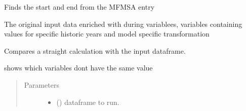 \documentclass[letterpaper,10pt,english]{sphinxmanual}
\begin{document}
\begin{fulllineitems}
\begin{fulllineitems}
\end{fulllineitems}


\begin{fulllineitems}
\label{\detokenize{onboard/modelgrabwf2:modelgrabwf2.GrabWfModel.mfmsa_start_end}}
\pysigstartsignatures
{}
\pysigstopsignatures
\sphinxAtStartPar
Finds the start and end from the MFMSA entry

\end{fulllineitems}


\begin{fulllineitems}
\label{\detokenize{onboard/modelgrabwf2:modelgrabwf2.GrabWfModel.dfmodel}}
\pysigstartsignatures
{}
\pysigstopsignatures
\sphinxAtStartPar
The original input data enriched with during variablees, variables containing
values for specific historic years and model specific transformation

\end{fulllineitems}


\begin{fulllineitems}
\label{\detokenize{onboard/modelgrabwf2:modelgrabwf2.GrabWfModel.test_model}}
\pysigstartsignatures
{}
\pysigstopsignatures
\sphinxAtStartPar
Compares a straight calculation with the input dataframe.

\sphinxAtStartPar
shows which variables dont have the same value
\begin{quote}\begin{description}
\item[{Parameters}] \leavevmode\begin{itemize}
\item {} 
\sphinxAtStartPar
{} () \textendash{} dataframe to run.


\end{itemize}
\end{description}
\end{quote}
\end{fulllineitems}
\end{fulllineitems}
\end{document}
